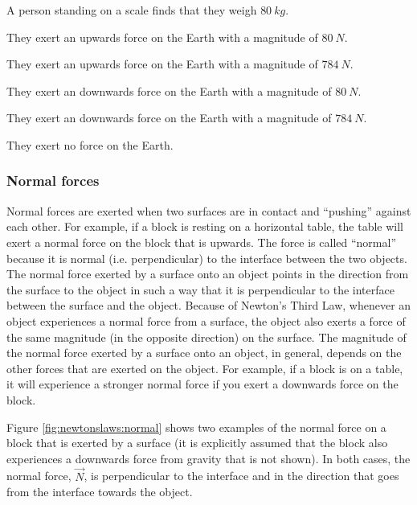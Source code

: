 \begin{checkpoint}
\begin{MCquestion}{A person standing on a scale finds that they weigh $\SI{80}{kg}$.}
\item They exert an upwards force on the Earth with a magnitude of $\SI{80}{N}$.
\item They exert an upwards force on the Earth with a magnitude of $\SI{784}{N}$.%
\item They exert an downwards force on the Earth with a magnitude of $\SI{80}{N}$.
\item They exert an downwards force on the Earth with a magnitude of $\SI{784}{N}$.
\item They exert no force on the Earth.
\end{MCquestion}
\end{checkpoint}


\subsubsection{Normal forces}
Normal forces are exerted when two surfaces are in contact and ``pushing'' against each other. For example, if a block is resting on a horizontal table, the table will exert a normal force on the block that is upwards. The force is called ``normal'' because it is normal (i.e. perpendicular) to the interface between the two objects. The normal force exerted by a surface onto an object points in the direction from the surface to the object in such a way that it is perpendicular to the interface between the surface and the object. Because of Newton's Third Law, whenever an object experiences a normal force from a surface, the object also exerts a force of the same magnitude (in the opposite direction) on the surface. The magnitude of the normal force exerted by a surface onto an object, in general, depends on the other forces that are exerted on the object. For example, if a block is on a table, it will experience a stronger normal force if you exert a downwards force on the block.

Figure \ref{fig:newtonslaws:normal} shows two examples of the normal force on a block that is exerted by a surface (it is explicitly assumed that the block also experiences a downwards force from gravity that is not shown). In both cases, the normal force, $\vec N$, is perpendicular to the interface and in the direction that goes from the interface towards the object.



